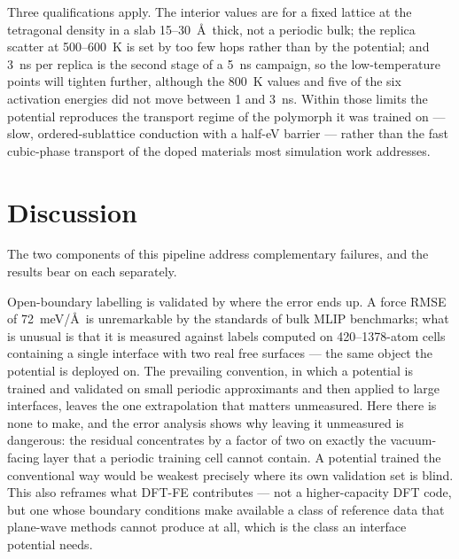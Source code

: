 \documentclass[11pt]{article}
\begin{document}
Three qualifications apply. The interior values are for a fixed lattice at the
tetragonal density in a slab 15--30~\AA\ thick, not a periodic bulk; the
replica scatter at 500--600~K is set by too few hops rather than by the
potential; and 3~ns per replica is the second stage of a 5~ns campaign, so the
low-temperature points will tighten further, although the 800~K values and
five of the six activation energies did not move between 1 and 3~ns. Within
those limits the potential reproduces the transport regime of the polymorph it
was trained on --- slow, ordered-sublattice conduction with a half-eV barrier
--- rather than the fast cubic-phase transport\citep{Murugan2007} of the doped materials most
simulation work addresses.

\section{Discussion}

The two components of this pipeline address complementary failures, and the
results bear on each separately.

Open-boundary labelling is validated by where the error ends up. A force RMSE
of 72~meV/\AA\ is unremarkable by the standards of bulk MLIP benchmarks; what
is unusual is that it is measured against labels computed on 420--1378-atom
cells containing a single interface with two real free surfaces --- the same
object the potential is deployed on. The prevailing convention, in which a
potential is trained and validated on small periodic approximants and then
applied to large interfaces, leaves the one extrapolation that matters
unmeasured. Here there is none to make, and the error analysis shows why
leaving it unmeasured is dangerous: the residual concentrates by a factor of
two on exactly the vacuum-facing layer that a periodic training cell cannot
contain. A potential trained the conventional way would be weakest precisely
where its own validation set is blind. This also reframes what DFT-FE
contributes --- not a higher-capacity DFT code, but one whose boundary
conditions make available a class of reference data that plane-wave methods
cannot produce at all, which is the class an interface potential needs.
\end{document}
